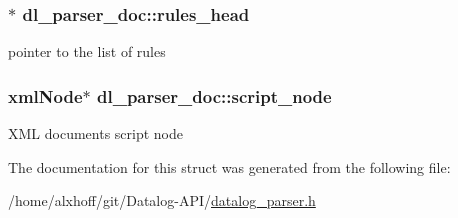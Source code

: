 \subsubsection[{\texorpdfstring{rules\+\_\+head}{rules_head}}]{$\ast$ dl\+\_\+parser\+\_\+doc\+::rules\+\_\+head}\hypertarget{structdl__parser__doc_a46ff67ec42f4b114c00fc804296bf1aa}{}\label{structdl__parser__doc_a46ff67ec42f4b114c00fc804296bf1aa}
pointer to the list of rules 
\subsubsection[{\texorpdfstring{script\+\_\+node}{script_node}}]{\setlength{\rightskip}{0pt plus 5cm}xml\+Node$\ast$ dl\+\_\+parser\+\_\+doc\+::script\+\_\+node}\hypertarget{structdl__parser__doc_a9b8a86089333b4dd2d50bbcb5e784562}{}\label{structdl__parser__doc_a9b8a86089333b4dd2d50bbcb5e784562}
X\+ML document\textquotesingle{}s script node 

The documentation for this struct was generated from the following file\+:\begin{DoxyCompactItemize}
\item 
/home/alxhoff/git/\+Datalog-\/\+A\+P\+I/\hyperlink{datalog__parser_8h}{datalog\+\_\+parser.\+h}\end{DoxyCompactItemize}
